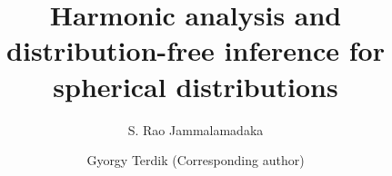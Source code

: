 \documentclass[preprint,11pt,a4paper]{elsarticle}
\begin{document}
\begin{frontmatter}%


%

\title{Harmonic analysis and distribution-free inference for spherical distributions}%

%

\author{S. Rao Jammalamadaka}%

\address{Department of Statistics and Applied Probability, University of California, Santa Barbara, CA 93106, USA \\ rao@pstat.ucsb.edu}%

\author{Gyorgy Terdik \small{(Corresponding author)}}%

\address{Faculty of Informatics, University of Debrecen, 4029 Debrecen, Hungary \\ Terdik.Gyorgy@inf.unideb.hu}%


\end{frontmatter}
\end{document}
